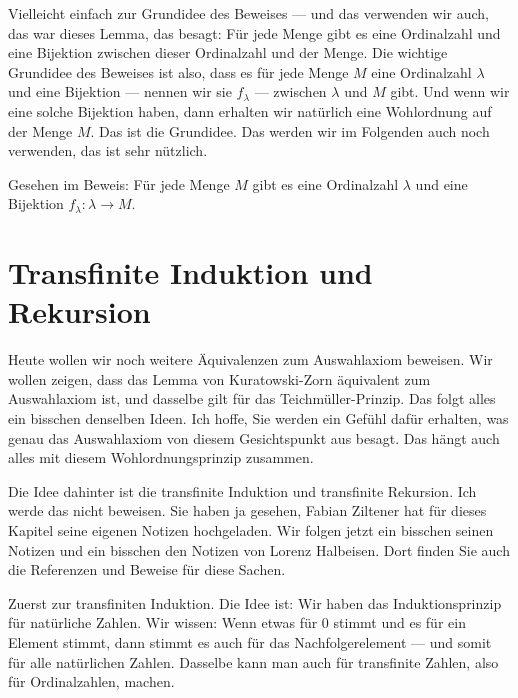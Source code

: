 \begin{spoken-clean}[00:21:00 - 00:25:00]
Vielleicht einfach zur Grundidee des Beweises --- und das verwenden wir auch, das war dieses Lemma, das besagt: Für jede Menge gibt es eine Ordinalzahl und eine Bijektion zwischen dieser Ordinalzahl und der Menge. Die wichtige Grundidee des Beweises ist also, dass es für jede Menge $M$ eine Ordinalzahl $\lambda$ und eine Bijektion --- nennen wir sie $f_\lambda$ --- zwischen $\lambda$ und $M$ gibt. Und wenn wir eine solche Bijektion haben, dann erhalten wir natürlich eine Wohlordnung auf der Menge $M$. Das ist die Grundidee. Das werden wir im Folgenden auch noch verwenden, das ist sehr nützlich.
\end{spoken-clean}

\begin{math-stroke}
Gesehen im Beweis:
Für jede Menge $M$ gibt es eine Ordinalzahl $\lambda$ und eine Bijektion $f_\lambda: \lambda \to M$.
\end{math-stroke}

\begin{ai-global-state-checkpoint-invisible-content}
\end{ai-global-state-checkpoint-invisible-content}

\section{Transfinite Induktion und Rekursion}

\begin{spoken-clean}[00:25:00 - 00:27:15]
Heute wollen wir noch weitere Äquivalenzen zum Auswahlaxiom beweisen. Wir wollen zeigen, dass das Lemma von Kuratowski-Zorn äquivalent zum Auswahlaxiom ist, und dasselbe gilt für das Teichmüller-Prinzip. Das folgt alles ein bisschen denselben Ideen. Ich hoffe, Sie werden ein Gefühl dafür erhalten, was genau das Auswahlaxiom von diesem Gesichtspunkt aus besagt. Das hängt auch alles mit diesem Wohlordnungsprinzip zusammen.

Die Idee dahinter ist die transfinite Induktion und transfinite Rekursion. Ich werde das nicht beweisen. Sie haben ja gesehen, Fabian Ziltener hat für dieses Kapitel seine eigenen Notizen hochgeladen. Wir folgen jetzt ein bisschen seinen Notizen und ein bisschen den Notizen von Lorenz Halbeisen. Dort finden Sie auch die Referenzen und Beweise für diese Sachen.

Zuerst zur transfiniten Induktion. Die Idee ist: Wir haben das Induktionsprinzip für natürliche Zahlen. Wir wissen: Wenn etwas für $0$ stimmt und es für ein Element stimmt, dann stimmt es auch für das Nachfolgerelement --- und somit für alle natürlichen Zahlen. Dasselbe kann man auch für transfinite Zahlen, also für Ordinalzahlen, machen.
\end{spoken-clean}


